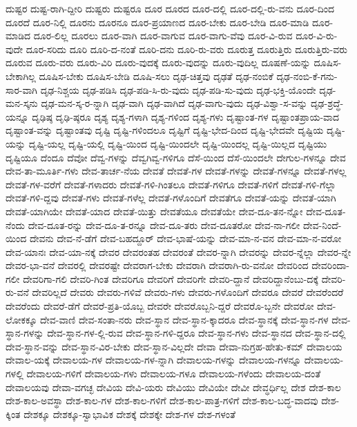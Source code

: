 {ದುಷ್ಟರ
ದುಷ್ಟ-ರಾಗಿ-ದ್ದೀರಿ
ದುಷ್ಟರು
ದುಷ್ಟರೂ
ದೂರ
ದೂರದ
ದೂರ-ದಲ್ಲಿ
ದೂರ-ದಲ್ಲಿ-ರು-ವನು
ದೂರ-ದಿಂದ
ದೂರದೆ
ದೂರ-ನಿಲ್ಲಿ
ದೂರನು
ದೂರನೂ
ದೂರ-ಪ್ರಯಾಣದ
ದೂರ-ಬೇಕು
ದೂರ-ಬೇಡಿ
ದೂರ-ಮಾಡಿ
ದೂರ-ಮಾಡಿದ
ದೂರ-ಲಿಲ್ಲ
ದೂರಲು
ದೂರ-ವಾಗಿ
ದೂರ-ವಾಗುವ
ದೂರ-ವಾಗು-ವೆವು
ದೂರ-ವಿ-ರುವ
ದೂರ-ವಿ-ರು-ವುದೇ
ದೂರ-ಸರಿದು
ದೂರಿ
ದೂರಿ-ದ-ನಂತೆ
ದೂರಿ-ದನು
ದೂರಿ-ರು-ವರು
ದೂರುತ್ತ
ದೂರುತ್ತಿರು
ದೂರುತ್ತಿರು-ವರು
ದೂರುವ
ದೂರು-ವರು
ದೂರು-ವಿರಿ
ದೂರು-ವುದಕ್ಕೆ
ದೂರು-ವುದನ್ನು
ದೂರು-ವುದಿಲ್ಲ
ದೂಷಣೆ-ಯನ್ನು
ದೂಷಿಸ-ಬೇಕಾಗಿಲ್ಲ
ದೂಷಿಸ-ಬೇಕು
ದೂಷಿಸ-ಬೇಡಿ
ದೂಷಿ-ಸಲು
ದೃಢ-ಚಿತ್ತವು
ದೃಢತೆ
ದೃಢ-ನಂಬಿಕೆ
ದೃಢ-ನಂಬಿ-ಕೆ-ಗನು-ಸಾರ-ವಾಗಿ
ದೃಢ-ನಿಶ್ಚಯ
ದೃಢ-ಪಡಿಸಿ
ದೃಢ-ಪಡಿ-ಸಿ-ರು-ವುದು
ದೃಢ-ಪಡಿ-ಸು-ವುದು
ದೃಢ-ಭಕ್ತಿ-ಯೊಂದೇ
ದೃಢ-ಮನ-ಸ್ಕನು
ದೃಢ-ಮನ-ಸ್ಕ-ರ-ನ್ನಾಗಿ
ದೃಢ-ವಾಗಿ
ದೃಢ-ವಾಗಿದೆ
ದೃಢ-ವಾಗು-ವುದು
ದೃಢ-ವಿಶ್ವಾ-ಸ-ವನ್ನು
ದೃಢ-ಶ್ರದ್ಧೆ-ಯನ್ನೂ
ದೃಢಿಷ್ಠ
ದೃಢಿ-ಷ್ಠರೂ
ದೃಶ್ಯ
ದೃಶ್ಯ-ಗಳಾಗಿ
ದೃಶ್ಯ-ಗಳಿಂದ
ದೃಶ್ಯ-ಗಳು
ದೃಷ್ಟಾಂತ-ಗಳ
ದೃಷ್ಟಾಂತಪ್ರಾಯ-ವಾದ
ದೃಷ್ಟಾಂತ-ವನ್ನು
ದೃಷ್ಟಾಂತವು
ದೃಷ್ಟಿ
ದೃಷ್ಟಿ-ಗಳಿಂದಲೂ
ದೃಷ್ಟಿಗೆ
ದೃಷ್ಟಿ-ಭೇದ-ದಿಂದ
ದೃಷ್ಟಿ-ಭೇದವೇ
ದೃಷ್ಟಿಯ
ದೃಷ್ಟಿ-ಯನ್ನು
ದೃಷ್ಟಿ-ಯಲ್ಲ
ದೃಷ್ಟಿ-ಯಲ್ಲಿ
ದೃಷ್ಟಿ-ಯಿಂದ
ದೃಷ್ಟಿ-ಯಿಂದಲೇ
ದೃಷ್ಟಿ-ಯಿಂದಲ್ಲ
ದೃಷ್ಟಿ-ಯಿಲ್ಲದ
ದೃಷ್ಟಿಯು
ದೃಷ್ಟಿಯೂ
ದೆಂದೂ
ದೆವೋ
ದೆವ್ವ-ಗಳನ್ನು
ದೆವ್ವಗಿವ್ವ-ಗಳಿಗೂ
ದೆಸೆ-ಯಿಂದ
ದೆಸೆ-ಯಿಂದಲೇ
ದೇಗುಲ-ಗಳನ್ನೂ
ದೇವ
ದೇವ-ತಾ-ಮೂರ್ತಿ-ಗಳು
ದೇವ-ತಾರ್ಚ-ನೆಯ
ದೇವತೆ
ದೇವತೆ-ಗಳ
ದೇವತೆ-ಗಳನ್ನು
ದೇವತೆ-ಗಳನ್ನೂ
ದೇವತೆ-ಗಳಲ್ಲ
ದೇವತೆ-ಗಳ-ವರೆಗೆ
ದೇವತೆ-ಗಳಾದರು
ದೇವತೆ-ಗಳಿ-ಗಿಂತಲೂ
ದೇವತೆ-ಗಳಿಗೂ
ದೇವತೆ-ಗಳಿಗೆ
ದೇವತೆ-ಗಳಿ-ಗೆಲ್ಲಾ
ದೇವತೆ-ಗಳಿ-ದ್ದವು
ದೇವತೆ-ಗಳು
ದೇವತೆ-ಗಳೆಲ್ಲ
ದೇವತೆ-ಗಳೊಂದಿಗೆ
ದೇವತೆಗೂ
ದೇವತೆ-ಯನ್ನು
ದೇವತೆ-ಯಾಗಿ
ದೇವತೆ-ಯಾಗಿಯೇ
ದೇವತೆ-ಯಾದ
ದೇವತೆ-ಯಿತ್ತು
ದೇವತೆಯೂ
ದೇವತೆಯೇ
ದೇವ-ದೂ-ತನ-ನ್ನೋ
ದೇವ-ದೂತ-ನೆಂದು
ದೇವ-ದೂತ-ರನ್ನು
ದೇವ-ದೂ-ತ-ರನ್ನೂ
ದೇವ-ದೂ-ತರು
ದೇವ-ದೂತರೋ
ದೇವ-ನಾ-ಗಲೀ
ದೇವ-ನಿಂದೆ-ಯಿಂದ
ದೇವನು
ದೇವ-ನೆ-ಡೆಗೆ
ದೇವ-ಬಹದ್ದೂರ್
ದೇವ-ಭಾಷೆ-ಯನ್ನು
ದೇವ-ಮಾ-ನ-ವನ
ದೇವ-ಮಾ-ನ-ವರೋ
ದೇವ-ಯಾನಃ
ದೇವ-ಯಾ-ನಕ್ಕೆ
ದೇವರ
ದೇವರಂತಹ
ದೇವರಂತೆ
ದೇವರ-ನ್ನಾಗಿ
ದೇವರನ್ನು
ದೇವರ-ನ್ನೆಲ್ಲಾ
ದೇವರ-ನ್ನೇ
ದೇವರ-ಭಾ-ವನೆ
ದೇವರಲ್ಲಿ
ದೇವರಷ್ಟೇ
ದೇವರಾಗ-ಬೇಕು
ದೇವರಾಗಿ
ದೇವರಾಗಿ-ರು-ವನೋ
ದೇವರಿಂದ
ದೇವರಿಂದಾ-ಗಲೀ
ದೇವರಿಗಾ-ಗಲಿ
ದೇವರಿ-ಗಿಂತ
ದೇವರಿಗೂ
ದೇವರಿಗೆ
ದೇವರಿಗೇ
ದೇವರಿ-ದ್ದಾನೆ
ದೇವರಿದ್ದಾನೆಂಬು-ದಕ್ಕೆ
ದೇವರಿ-ರು-ವನೆ
ದೇವರಿಲ್ಲದೆ
ದೇವರು
ದೇವರು-ಗಳಿವೆ
ದೇವರು-ಗಳು
ದೇವರು-ಗಳೊಂದಿಗೆ
ದೇವರೂ
ದೇವರೆ
ದೇವರೆಂದರೆ
ದೇವರೆಂದು
ದೇವರೆ-ಡೆಗೆ
ದೇವರೆ-ಪ್ರತಿ-ಯೊಬ್ಬ
ದೇವರೇ
ದೇವರೊಬ್ಬನಿ-ದ್ದರೆ
ದೇವರೊ-ಬ್ಬನೇ
ದೇವರೋ
ದೇವ-ಲೋಕಕ್ಕೂ
ದೇವ-ವಾಣಿ
ದೇವ-ಸಂತಾ-ನರು
ದೇವ-ಸ್ಥಾನ
ದೇವ-ಸ್ಥಾನ-ಕ್ಕಾದರೂ
ದೇವ-ಸ್ಥಾನಕ್ಕೆ
ದೇವ-ಸ್ಥಾನ-ಗಳ
ದೇವ-ಸ್ಥಾನ-ಗಳನ್ನು
ದೇವ-ಸ್ಥಾನ-ಗಳ-ಲ್ಲಿ-ರುವ
ದೇವ-ಸ್ಥಾನ-ಗಳಿ-ದ್ದರೂ
ದೇವ-ಸ್ಥಾನ-ಗಳು
ದೇವ-ಸ್ಥಾನದ
ದೇವ-ಸ್ಥಾನ-ದಲ್ಲಿ
ದೇವ-ಸ್ಥಾನ-ವನ್ನು
ದೇವ-ಸ್ಥಾನ-ವಿರ-ಬೇಕು
ದೇವ-ಸ್ಥಾನ-ವಿಲ್ಲದೇ
ದೇವಾ
ದೇವಾ-ನುಗ್ರಹ-ಹೇತು-ಕಮ್
ದೇವಾಲಯ
ದೇವಾಲ-ಯಕ್ಕೆ
ದೇವಾಲಯ-ಗಳ
ದೇವಾಲಯ-ಗಳ-ನ್ನಾಗಿ
ದೇವಾಲಯ-ಗಳನ್ನು
ದೇವಾಲಯ-ಗಳನ್ನೂ
ದೇವಾಲಯ-ಗಳಲ್ಲಿ
ದೇವಾಲಯ-ಗಳಿಗೆ
ದೇವಾಲಯ-ಗಳು
ದೇವಾಲಯ-ಗಳೂ
ದೇವಾಲಯ-ಗಳೆಂದು
ದೇವಾಲಯ-ದಂತೆ
ದೇವಾಲಯವು
ದೇವಾ-ವಗಚ್ಛ
ದೇವಿಯ
ದೇವಿ-ಯರು
ದೇವಿಯು
ದೇವಿಯೇ
ದೇವೀ
ದೇವ್ಧರ್ಧಿಲ್ಲ
ದೇಶ
ದೇಶ-ಕಾಲ
ದೇಶ-ಕಾಲ-ಅವಸ್ಥಾ
ದೇಶ-ಕಾಲ-ಗಳ
ದೇಶ-ಕಾಲ-ಗಳಿಗೆ
ದೇಶ-ಕಾಲ-ಪಾತ್ರ-ಗಳಿಗೆ
ದೇಶ-ಕಾಲ-ಬದ್ಧ-ವಾದವು
ದೇಶ-ಕ್ಕಿಂತ
ದೇಶಕ್ಕೂ
ದೇಶಕ್ಕೂ-ಸ್ವಾಭಾವಿಕ
ದೇಶಕ್ಕೆ
ದೇಶಕ್ಕೇ
ದೇಶ-ಗಳ
ದೇಶ-ಗಳಂತೆ
}
